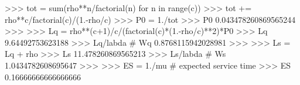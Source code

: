
>>> tot = sum(rho**n/factorial(n) for n in range(c))
>>> tot += rho**c/factorial(c)/(1.-rho/c)
>>> P0 = 1./tot
>>> P0
0.043478260869565244
>>>
>>> Lq = rho**(c+1)/c/(factorial(c)*(1.-rho/c)**2)*P0
>>> Lq
9.64492753623188
>>> Lq/labda # Wq
0.8768115942028981
>>>
>>> Ls = Lq + rho
>>> Ls
11.478260869565213
>>> Ls/labda # Ws
1.0434782608695647
>>>
>>> ES = 1./mu # expected service time
>>> ES
0.16666666666666666

